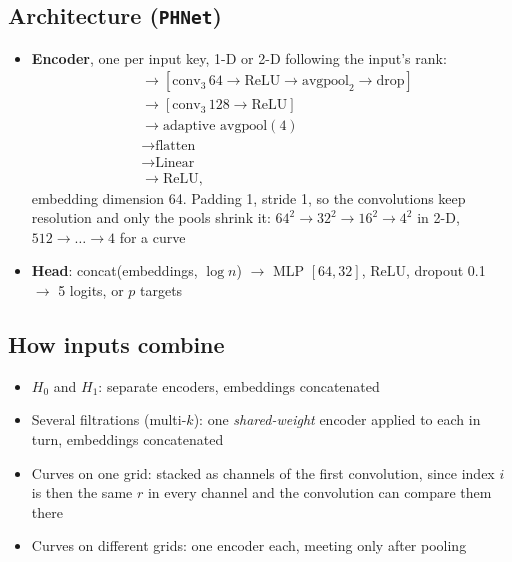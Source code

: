 \documentclass[11pt]{article}
\begin{document}
\subsection*{Architecture (\texttt{PHNet})}
\begin{itemize}
  \item \textbf{Encoder}, one per input key, 1-D or 2-D following the input's rank:
  \begin{align*}
    [\text{conv}_3\,32 \to \text{ReLU} \to \text{avgpool}_2 \to \text{drop}]
    & \to [\text{conv}_3\,64 \to \text{ReLU} \to \text{avgpool}_2 \to \text{drop}] \\
    & \to [\text{conv}_3\,128 \to \text{ReLU}] \\
    & \to \text{adaptive avgpool}(4) \\
    & \to \text{flatten} \\
    & \to \text{Linear} \\
    & \to \text{ReLU},
  \end{align*}
  embedding dimension 64. Padding 1, stride 1, so the convolutions keep resolution and only the pools shrink it: $64^2\to32^2\to16^2\to4^2$ in 2-D, $512\to\dots\to4$ for a curve
  \item \textbf{Head}: concat(embeddings, $\log n$) $\to$ MLP $[64,32]$, ReLU, dropout 0.1 $\to$ 5 logits, or $p$ targets
\end{itemize}

\subsection*{How inputs combine}
\begin{itemize}
  \item $H_0$ and $H_1$: separate encoders, embeddings concatenated
  \item Several filtrations (multi-$k$): one \emph{shared-weight} encoder applied to each in turn, embeddings concatenated
  \item Curves on one grid: stacked as channels of the first convolution, since index $i$ is then the same $r$ in every channel and the convolution can compare them there
  \item Curves on different grids: one encoder each, meeting only after pooling
\end{itemize}
\end{document}

